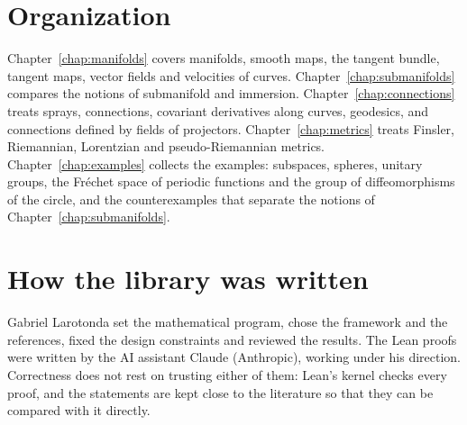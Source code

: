 \section*{Organization}

Chapter~\ref{chap:manifolds} covers manifolds, smooth maps, the tangent bundle, tangent maps,
vector fields and velocities of curves. Chapter~\ref{chap:submanifolds} compares the notions of
submanifold and immersion. Chapter~\ref{chap:connections} treats sprays, connections, covariant
derivatives along curves, geodesics, and connections defined by fields of projectors.
Chapter~\ref{chap:metrics} treats Finsler, Riemannian, Lorentzian and pseudo-Riemannian metrics.
Chapter~\ref{chap:examples} collects the examples: subspaces, spheres, unitary groups, the Fréchet
space of periodic functions and the group of diffeomorphisms of the circle, and the
counterexamples that separate the notions of Chapter~\ref{chap:submanifolds}.

\section*{How the library was written}

Gabriel Larotonda set the mathematical program, chose the framework and the references, fixed
the design constraints and reviewed the results. The Lean proofs were written by the AI assistant
Claude (Anthropic), working under his direction. Correctness does not rest on trusting either of
them: Lean's kernel \cite{dMU21} checks every proof, and the statements are kept close to the
literature so that they can be compared with it directly.
